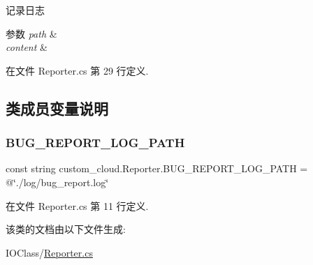 记录日志 


\begin{DoxyParams}{参数}
{\em path} & \\
\hline
{\em content} & \\
\hline
\end{DoxyParams}


在文件 Reporter.\+cs 第 29 行定义.



\subsection{类成员变量说明}
\mbox{\label{classcustom__cloud_1_1_reporter_a999ad2f96c992d72ff43590256d3a3f7}} 
\subsubsection{\texorpdfstring{B\+U\+G\+\_\+\+R\+E\+P\+O\+R\+T\+\_\+\+L\+O\+G\+\_\+\+P\+A\+TH}{BUG\_REPORT\_LOG\_PATH}}
{\footnotesize\ttfamily const string custom\+\_\+cloud.\+Reporter.\+B\+U\+G\+\_\+\+R\+E\+P\+O\+R\+T\+\_\+\+L\+O\+G\+\_\+\+P\+A\+TH = @\char`\"{}./log/bug\+\_\+report.\+log\char`\"{}}



在文件 Reporter.\+cs 第 11 行定义.



该类的文档由以下文件生成\+:\begin{DoxyCompactItemize}
\item 
I\+O\+Class/\hyperlink{_i_o_class_2_reporter_8cs}{Reporter.\+cs}\end{DoxyCompactItemize}

